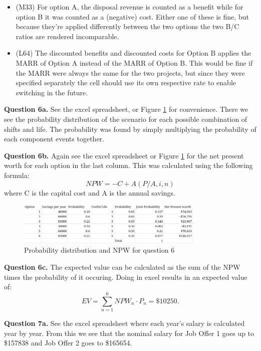 \documentclass[letterpaper, reqno,11pt]{article}
\begin{document}
\begin{itemize}
    \item{(M33) For option A, the disposal revenue is counted as a benefit while for option B it was counted as a (negative) cost. Either one of these is fine, but because they're applied differently between the two options the two B/C ratios are rendered incomparable. }
    \item{(L64) The discounted benefits and discounted costs for Option B applies the MARR of Option A instead of the MARR of Option B. This would be fine if the MARR were always the same for the two projects, but since they were specified separately the cell should use its own respective rate to enable switching in the future. }
\end{itemize}
    
\medskip

{\noindent\bf Question 6a.} See the excel spreadsheet, or Figure \ref{fig:q6} for convenience. There we see the probability distribution of the scenario for each possible combination of shifts and life. The probability was found by simply multiplying the probability of each component events together. 

\medskip

{\noindent\bf Question 6b.} Again see the excel spreadsheet or Figure \ref{fig:q6} for the net present worth for each option in the last column. This was calculated using the following formula: 
\[
NPW=-C+A(P /A, i, n)
\]
where C is the capital cost and A is the annual savings. 

\medskip

\begin{figure}[htpb]
    \centering
    \includegraphics[width=0.8\textwidth]{q6}
    \caption{Probability distribution and NPW for question 6}
    \label{fig:q6}
\end{figure}

{\noindent\bf Question 6c.} The expected value can be calculated as the sum of the NPW times the probability of it occuring. Doing in excel results in an expected value of: 
\[
    EV=\sum_{n=1}^6 NPW_n\cdot P_n=\$10250
.\]

\medskip

{\noindent\bf Question 7a.} See the excel spreadsheet where each year's salary is calculated year by year. From this we see that the nominal salary for Job Offer 1 goes up to \$157838 and Job Offer 2 goes to \$165654. 
\end{document}
